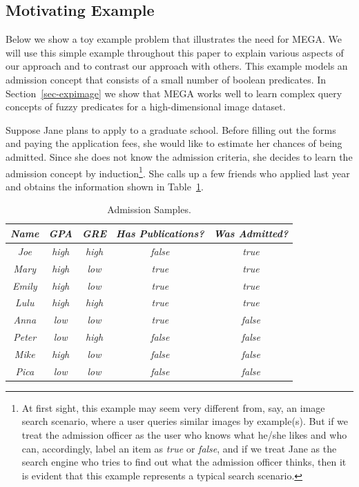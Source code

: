 

\subsection{Motivating Example}
                                                  
Below we show a toy example problem that illustrates
the need for MEGA. We will use this simple example throughout
this paper to explain various aspects of our approach
and to contrast our approach with others. 
This example models an admission concept that
consists of a small number of boolean predicates.
In Section~\ref{sec-expimage} we
show that MEGA works well to learn complex query concepts 
of fuzzy predicates
for a high-dimensional image dataset.

Suppose Jane plans to apply to
a graduate school. Before filling out the
forms and paying the application fees, she would like
to estimate her chances of being admitted. Since
she does not know the admission criteria, 
she decides to learn the admission concept by 
induction\footnote{
At first sight, this example may seem very different from, say,
an image search scenario, where a user queries similar
images by example(s). But if we treat the admission officer
as the user who knows what he/she likes and who can, accordingly, 
label an item as {\it true} or {\it false}, and if
we treat Jane as the search engine who tries to
find out what the admission officer thinks, then
it is evident that this example represents a typical
search scenario.
}.
She calls up a few friends who applied
last year and obtains
the information shown in Table~\ref{tab-ex1}.

\begin{table}[ht]
\begin{footnotesize}
\begin{center}
\begin{tabular}{|c|c|c|c|c|} \hline
{\it Name} & {\it GPA} & {\it GRE} & {\it Has Publications?} & {\it Was Admitted?} \\ \hline \hline
{\it Joe}   & {\it high} & {\it high} & {\it false} & {\it true}  \\
{\it Mary}  & {\it high} & {\it low}  & {\it true}  & {\it true}  \\
{\it Emily} & {\it high} & {\it low}  & {\it true}  & {\it true}  \\
{\it Lulu}  & {\it high} & {\it high} & {\it true}  & {\it true}  \\
{\it Anna}  & {\it low}  & {\it low}  & {\it true}  & {\it false} \\
{\it Peter} & {\it low}  & {\it high} & {\it false} & {\it false} \\
{\it Mike}  & {\it high} & {\it low}  & {\it false} & {\it false} \\
{\it Pica}  & {\it low}  & {\it low}  & {\it false} & {\it false} \\
\hline
\hline
\end{tabular} 
\end{center}
\end{footnotesize}
\caption{Admission Samples.}
\label{tab-ex1}
\end{table}

